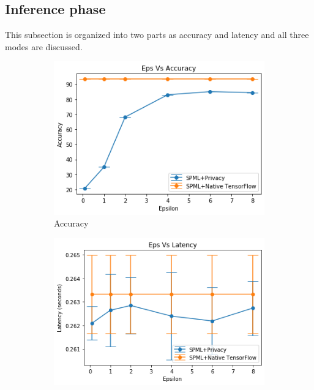 \subsection{Inference phase}
This subsection is organized into two parts as accuracy and latency and all three modes are discussed.
\begin{figure}
     \begin{subfigure}{0.5\textwidth}
         \includegraphics[width=\textwidth]{images/Inference/MnistNativeAccuracyInference.png}
         \caption{Accuracy}
         \label{fig:nativeMnistAccuracyInference}
     \end{subfigure}
     \begin{subfigure}{0.5\textwidth}
         \includegraphics[width=\textwidth]{images/Inference/MnistNativeLatencyInference.png}

\end{subfigure}
\end{figure}
